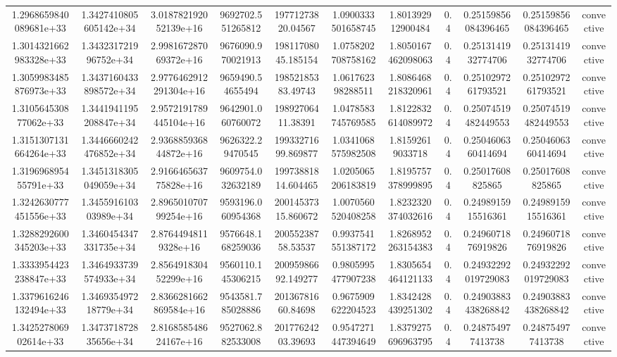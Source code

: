 \begin{table}
\begin{tabular}{ccccccccccc}
1.2968659840089681e+33 & 1.3427410805605142e+34 & 3.018782192052139e+16 & 9692702.551265812 & 19771273820.04567 & 1.0900333501658745 & 1.801392912900484 & 0.4 & 0.25159856084396465 & 0.25159856084396465 & convective \\
1.3014321662983328e+33 & 1.343231721996752e+34 & 2.998167287069372e+16 & 9676090.970021913 & 19811708045.185154 & 1.0758202708758162 & 1.8050167462098063 & 0.4 & 0.2513141932774706 & 0.2513141932774706 & convective \\
1.3059983485876973e+33 & 1.3437160433898572e+34 & 2.9776462912291304e+16 & 9659490.54655494 & 19852185383.49743 & 1.061762398288511 & 1.8086468218320961 & 0.4 & 0.2510297261793521 & 0.2510297261793521 & convective \\
1.310564530877062e+33 & 1.3441941195208847e+34 & 2.9572191789445104e+16 & 9642901.060760072 & 19892706411.38391 & 1.0478583745769585 & 1.8122832614089972 & 0.4 & 0.25074519482449553 & 0.25074519482449553 & convective \\
1.3151307131664264e+33 & 1.3446660242476852e+34 & 2.936885936844872e+16 & 9626322.29470545 & 19933271699.869877 & 1.0341068575982508 & 1.81592619033718 & 0.4 & 0.2504606360414694 & 0.2504606360414694 & convective \\
1.319696895455791e+33 & 1.3451318305049059e+34 & 2.916646563775828e+16 & 9609754.032632189 & 19973881814.604465 & 1.0205065206183819 & 1.8195757378999895 & 0.4 & 0.25017608825865 & 0.25017608825865 & convective \\
1.3242630777451556e+33 & 1.345591610303989e+34 & 2.896501070799254e+16 & 9593196.060954368 & 20014537315.860672 & 1.0070560520408258 & 1.8232320374032616 & 0.4 & 0.2498915915516361 & 0.2498915915516361 & convective \\
1.3288292600345203e+33 & 1.3460454347331735e+34 & 2.87644948119328e+16 & 9576648.168259036 & 20055238758.53537 & 0.9937541551387172 & 1.8268952263154383 & 0.4 & 0.2496071876919826 & 0.2496071876919826 & convective \\
1.3333954423238847e+33 & 1.3464933739574933e+34 & 2.856491830452299e+16 & 9560110.145306215 & 20095986692.149277 & 0.9805995477907238 & 1.8305654464121133 & 0.4 & 0.24932292019729083 & 0.24932292019729083 & convective \\
1.3379616246132494e+33 & 1.346935497218779e+34 & 2.8366281662869584e+16 & 9543581.785028886 & 20136781660.84698 & 0.9675909622204523 & 1.8342428439251302 & 0.4 & 0.24903883438268842 & 0.24903883438268842 & convective \\
1.342527806902614e+33 & 1.347371872835656e+34 & 2.816858548624167e+16 & 9527062.882533008 & 20177624203.39693 & 0.9547271447394649 & 1.8379275696963795 & 0.4 & 0.248754977413738 & 0.248754977413738 & convective \\

\end{tabular}
\end{table}
